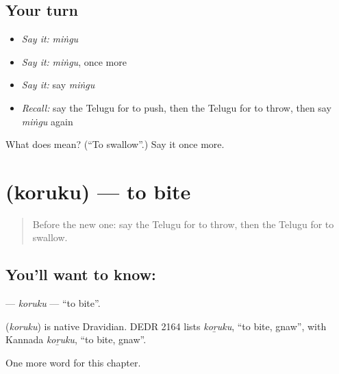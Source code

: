 \subsection*{Your turn}
\begin{itemize}
\raggedright
  \item \emph{Say it:} \emph{miṅgu}
  \item \emph{Say it:} \emph{miṅgu}, once more
  \item \emph{Say it:} say \emph{miṅgu}
  \item \emph{Recall:} say the Telugu for to push, then the Telugu for to throw, then say \emph{miṅgu} again
\end{itemize}

\begin{tcolorbox}[breakable,colback=teal!4,colframe=teal!35!black,title={Before you move on}]
What does  mean? (\textquotedblleft{}To swallow\textquotedblright{}.) Say it once more.
\end{tcolorbox}
\section[\texorpdfstring{\te{కొరుకు} (koruku)}{కొరుకు (koruku)}]{ (koruku) — to bite}

\label{lesson:TE-C241-koruku}



\begin{quote}
Before the new one: say the Telugu for to throw, then the Telugu for to swallow.
\end{quote}

\subsection*{You'll want to know: }
\textbf{} — \emph{koruku} — \textquotedblleft{}to bite\textquotedblright{}.

\begin{cousinweb}
\textbf{} (\emph{koruku}) is native Dravidian. DEDR 2164 lists \emph{koṟuku}, \textquotedblleft{}to bite, gnaw\textquotedblright{}, with Kannada \emph{koṟuku}, \textquotedblleft{}to bite, gnaw\textquotedblright{}.
\end{cousinweb}

\begin{grammarlens}[title={What you've built}]
One more word for this chapter.
\end{grammarlens}

